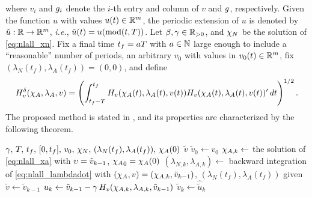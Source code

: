 where $v_i$ and $g_i$ denote the $i$-th entry and column of $v$ and $g$, respectively.
Given the function $u$ with values $u(t)\in\mathbb{R}^m$, the periodic extension of $u$ is denoted by $\hat{u} : \mathbb{R} \rightarrow \mathbb{R}^m$, \emph{i.e.}, $\hat{u}(t) = u(\operatorname{mod}(t, T))$.
Let $\beta,\gamma\in\mathbb{R}_{>0}$, and $\chi_N$ be the solution of \eqref{eq:nlall_xn}. Fix a final time $t_f=aT$ with $a\in\mathbb{N}$ large enough to include a ``reasonable'' number of periods, an arbitrary $v_0$ with values in $v_0(t)\in\mathbb{R}^m$, fix $(\lambda_N(t_f),\lambda_A(t_f))=(0,0)$, and define
\begin{equation}
  \label{eq:nlall_deltadH}
  H_v^\delta(\chi_A,\lambda_A,v) = \left( \int_{t_f-T}^{t_f} H_v(\chi_A(t),\lambda_A(t),v(t)) H_v(\chi_A(t),\lambda_A(t),v(t))'\,dt \right)^{1/2}.
\end{equation}
The proposed method is stated in , and its properties are characterized by the following theorem.

\begin{algorithm}[!t]
  \caption{Steady-state steepest descent algorithm \cite{masocco_dynamic_2024}.}
  \label{alg:nlall_sweep}
  \begin{algorithmic}[1]
    \Require $\gamma,\,T,\,t_f,\,[0,t_f],\,v_0,\,\chi_N,\,(\lambda_N(t_f),\lambda_A(t_f)),\,\chi_A(0)$
    \Ensure $\tilde{v}$
    \State $\tilde{v}_0 \gets v_0$
      \State $\chi_{A,k} \gets$ the solution of \eqref{eq:nlall_xa} with $\upsilon=\tilde{v}_{k-1}$, ${\chi_A}_0=\chi_A(0)$
      \State $(\lambda_{N,k},\lambda_{A,k}) \gets$ backward integration of \eqref{eq:nlall_lambdadot} with
      \Statex \hspace{3.05cm}$(\chi_A,v)=(\chi_{A,k},\tilde{v}_{k-1})$, $(\lambda_N(t_f),\lambda_A(t_f))$ given
        \Return $\tilde{v} \gets \tilde{v}_{k-1}$
      \Else
        \State $u_k \gets \tilde{v}_{k-1} - \gamma\,H_v(\chi_{A,k},\lambda_{A,k},\tilde{v}_{k-1})$
        \State $\tilde{v}_k \gets \hat{\tilde{u}}_k$ 
      \EndIf
    \EndFor
  \end{algorithmic}
\end{algorithm}

